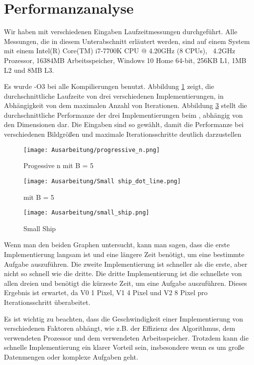 \documentclass[course=erap]{aspdoc}
\begin{document}
\section{Performanzanalyse}
Wir haben mit verschiedenen Eingaben Laufzeitmessungen durchgeführt. Alle Messungen, die in diesem Unterabschnitt erläutert werden, sind auf einem System mit einem Intel(R) Core(TM) i7-7700K CPU @ 4.20GHz (8 CPUs), ~4.2GHz Prozessor, 16384MB Arbeitsspeicher, Windows 10 Home 64-bit, 256KB L1, 1MB L2 und 8MB L3.

Es wurde -O3 bei alle Kompilierungen benutzt. Abbildung \ref{fig:progressive_n} zeigt, die durchschnittliche Laufzeite von drei verschiedenen Implementierungen, in Abhängigkeit von dem maximalen Anzahl von Iterationen. Abbildung \ref{fig:small_ship} stellt die durchschnittliche Performanze der drei Implementierungen beim , abhängig von den Dimensionen dar. Die Eingaben sind so gewählt, damit die Performanze bei verschiedenen Bildgrößen und maximale Iterationsschritte deutlich darzustellen
\begin{figure}[htp]
    \centering
    \texttt{[image: Ausarbeitung/progressive\_n.png]}
    \caption{Progessive n mit B = 5}
    \label{fig:progressive_n}
\end{figure}

\begin{figure}[htp]
    \centering
    \texttt{[image: Ausarbeitung/Small ship\_dot\_line.png]}
    \caption{ mit B = 5}
    \label{fig:small_ship_graph}
\end{figure}

\begin{figure}[htp]
    \centering
    \texttt{[image: Ausarbeitung/small\_ship.png]}
    \caption{Small Ship}
    \label{fig:small_ship}
\end{figure}

Wenn man den beiden Graphen untersucht, kann man sagen, dass die erste Implementierung langsam ist und eine längere Zeit benötigt, um eine bestimmte Aufgabe auszuführen. Die zweite Implementierung ist schneller als die erste, aber nicht so schnell wie die dritte. Die dritte Implementierung ist die schnellste von allen dreien und benötigt die kürzeste Zeit, um eine Aufgabe auszuführen. Dieses Ergebnis ist erwartet, da V0 1 Pixel, V1 4 Pixel und V2 8 Pixel pro Iterationsschritt überabeitet.

Es ist wichtig zu beachten, dass die Geschwindigkeit einer Implementierung von verschiedenen Faktoren abhängt, wie z.B. der Effizienz des Algorithmus, dem verwendeten Prozessor und dem verwendeten Arbeitsspeicher. Trotzdem kann die schnelle Implementierung ein klarer Vorteil sein, insbesondere wenn es um große Datenmengen oder komplexe Aufgaben geht.
\end{document}

